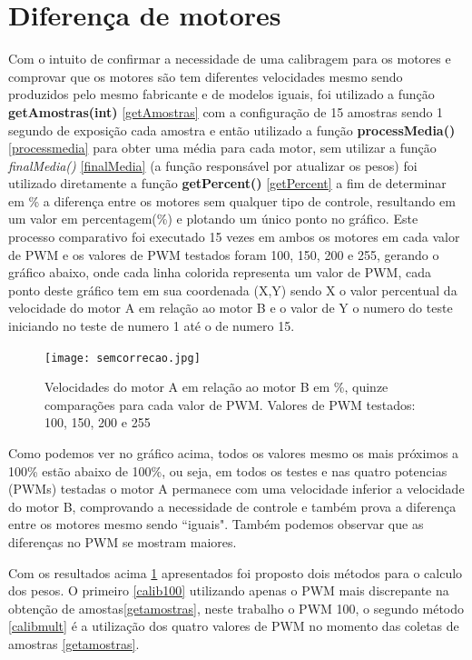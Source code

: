 \documentclass[a4paper,12pt,portuguese]{ufms-cpcx}
\begin{document}
\section{Diferença de motores}
Com o intuito de confirmar a necessidade de uma calibragem para os motores e comprovar que os motores são tem diferentes velocidades mesmo sendo produzidos pelo mesmo fabricante e de modelos iguais, foi utilizado a função \textbf{getAmostras(int)} \ref{getAmostras} com a configuração de 15 amostras sendo 1 segundo de exposição cada amostra e então utilizado a função \textbf{processMedia()} \ref{processmedia} para obter uma média para cada motor, sem utilizar a função \textit{finalMedia()} \ref{finalMedia} (a função responsável por atualizar os pesos) foi utilizado diretamente a função \textbf{getPercent()} \ref{getPercent} a fim de determinar em \% a diferença entre os motores sem qualquer tipo de controle, resultando em um valor em percentagem(\%) e plotando um único ponto no gráfico. Este processo comparativo foi executado 15 vezes em ambos os motores em cada valor de PWM e os valores de PWM testados foram 100, 150, 200 e 255, gerando o gráfico abaixo, onde cada linha colorida representa um valor de PWM, cada ponto deste gráfico tem em sua coordenada (X,Y) sendo X o valor percentual da velocidade do motor A em relação ao motor B e o valor de Y o numero do teste iniciando no teste de numero 1 até o de numero 15.

\begin{figure}[H]	
	\centering
	\texttt{[image: semcorrecao.jpg]}
	\caption{Velocidades do motor A em relação ao motor B em \%, quinze comparações para cada valor de PWM. Valores de PWM testados: 100, 150, 200 e 255}
	\label{fig:semcorrecao}
\end{figure}

Como podemos ver no gráfico acima, todos os valores mesmo os mais próximos a 100\% estão abaixo de 100\%, ou seja, em todos os testes e nas quatro potencias (PWMs) testadas o motor A permanece com uma velocidade inferior a velocidade do motor B, comprovando a necessidade de controle e também prova a diferença entre os motores mesmo sendo ``iguais". Também podemos observar que as diferenças no PWM se mostram maiores.

Com os resultados acima \ref{fig:semcorrecao} apresentados foi proposto dois métodos para o calculo dos pesos. O primeiro \ref{calib100} utilizando apenas o PWM mais discrepante na obtenção de amostas\ref{getamostras}, neste trabalho o PWM 100, o segundo método \ref{calibmult} é a utilização dos quatro valores de PWM no momento das coletas de amostras \ref{getamostras}.
\end{document}
